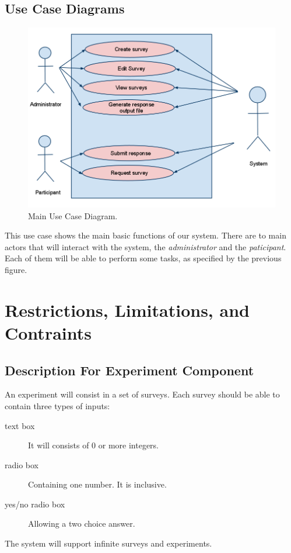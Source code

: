 \documentclass[a4paper,12pt,oneside]{report}
\begin{document}
\section{Use Case Diagrams}
\vskip 1cm
\begin{figure}[h!]
  \begin{center}
   \includegraphics[width=12.2cm]{pics/usecase.png}
  \end{center}
\caption{Main Use Case Diagram.}
\end{figure}
\vskip 1cm
This use case shows the main basic functions of our system. There are to main actors that will interact with the system, the \emph{administrator} and the \emph{paticipant}. Each of them will be able to perform some tasks, as specified by the previous figure.


\chapter{ Restrictions, Limitations, and Contraints}

\section{ Description For Experiment Component}
An experiment will consist in a set of surveys. Each survey should be able to contain three types of inputs:
\begin{description}
\item [text box] It will consists of 0 or more integers.
\item [radio box] Containing one number. It is inclusive.
\item  [yes/no radio box] Allowing a two choice answer.
\end{description}
The system will support infinite surveys and experiments.
\end{document}
